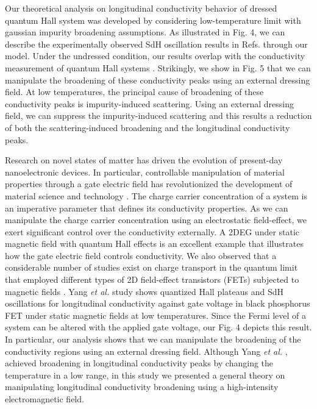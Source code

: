\documentclass{article}
\begin{document}
\begin{itemize}
{  Our theoretical analysis on longitudinal conductivity behavior of dressed quantum Hall system was developed by considering low-temperature limit with gaussian impurity broadening assumptions.
  As illustrated in Fig. 4, we can describe the experimentally observed SdH oscillation results in Refs.\cite{endo09,wakabayashi78} through our model.
  Under the undressed condition, our results overlap with the conductivity measurement of quantum Hall systems \cite{endo09}. Strikingly, we show in Fig. 5 that we can manipulate the broadening of these conductivity peaks using an external dressing field. At low temperatures, the principal cause of broadening of these conductivity peaks is impurity-induced scattering. Using an external dressing field, we can suppress the impurity-induced scattering and this results a reduction of both the scattering-induced broadening and the longitudinal conductivity peaks.

  Research on novel states of matter has driven the evolution of present-day nanoelectronic devices. In particular, controllable manipulation of material properties through a gate electric field has revolutionized the development of material science and technology \cite{ahn03,deng18}.
  The charge carrier concentration of a system is an imperative parameter that defines its conductivity properties.
  As we can manipulate the charge carrier concentration using an electrostatic field-effect, we exert significant control over the conductivity externally.
  A 2DEG under static magnetic field with quantum Hall effects is an excellent example that illustrates how the gate electric field controls conductivity.
  We also observed that a considerable number of studies exist on charge transport in the quantum limit that employed different types of 2D field-effect transistors (FETs) subjected to magnetic fields \cite{wakabayashi78,yang18,long20,li14}. Yang \textit{et al.} \cite{yang18} study shows quantized Hall plateaus and SdH oscillations for longitudinal conductivity against gate voltage in black phosphorus FET under static magnetic fields at low temperatures. Since the Fermi level of a system can be altered with the applied gate voltage, our Fig. 4 depicts this result.
  In particular, our analysis shows that we can manipulate the broadening of the conductivity regions using an external dressing field. Although Yang \textit{et al.} \cite{yang18}, achieved broadening in longitudinal conductivity peaks by changing the temperature in a low range, in this study we presented a general theory on manipulating longitudinal conductivity broadening using a high-intensity electromagnetic field.

}
\end{itemize}
\end{document}

